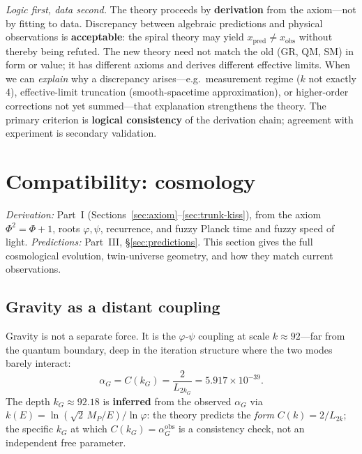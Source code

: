 \documentclass[12pt,a4paper]{article}
\begin{document}
\medskip
\noindent\textit{Logic first, data second.}
The theory proceeds by \textbf{derivation} from the axiom---not by fitting to data. Discrepancy between algebraic predictions and physical observations is \textbf{acceptable}: the spiral theory may yield $x_{\mathrm{pred}} \neq x_{\mathrm{obs}}$ without thereby being refuted. The new theory need not match the old (GR, QM, SM) in form or value; it has different axioms and derives different effective limits. When we can \emph{explain} why a discrepancy arises---e.g.\ measurement regime ($k$ not exactly 4), effective-limit truncation (smooth-spacetime approximation), or higher-order corrections not yet summed---that explanation strengthens the theory. The primary criterion is \textbf{logical consistency} of the derivation chain; agreement with experiment is secondary validation.

\section{Compatibility: cosmology}
\label{sec:cosmology-domain}
\label{sec:twin-universes}
\label{sec:cosmology}
\label{sec:gravity-cosmology}

\noindent\textit{Derivation:} Part~I (Sections~\ref{sec:axiom}--\ref{sec:trunk-kiss}), from the axiom $\Phi^2=\Phi+1$, roots $\varphi,\psi$, recurrence, and fuzzy Planck time and fuzzy speed of light. \textit{Predictions:} Part~III, \S\ref{sec:predictions}. This section gives the full cosmological evolution, twin-universe geometry, and how they match current observations.

\subsection{Gravity as a distant coupling}

Gravity is not a separate force. It is the $\varphi$-$\psi$ coupling at scale $k \approx 92$---far from the quantum boundary, deep in the iteration structure where the two modes barely interact:
\begin{equation}
\alpha_G = C(k_G) = \frac{2}{L_{2k_G}} = 5.917 \times 10^{-39}.
\end{equation}
The depth $k_G \approx 92.18$ is \textbf{inferred} from the observed $\alpha_G$ via $k(E) = \ln(\sqrt{2}\,M_P/E)/\ln\varphi$: the theory predicts the \emph{form} $C(k) = 2/L_{2k}$; the specific $k_G$ at which $C(k_G) = \alpha_G^{\mathrm{obs}}$ is a consistency check, not an independent free parameter.
\end{document}

